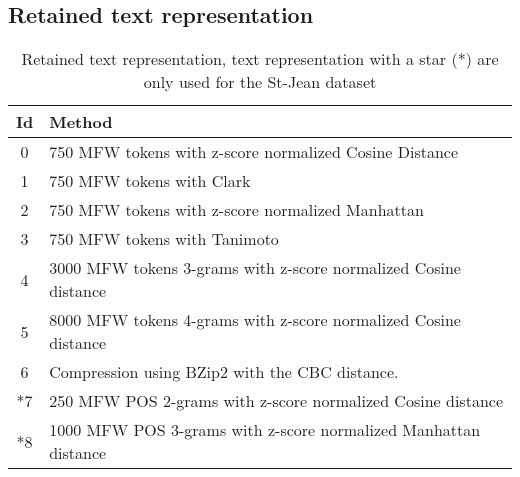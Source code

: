 \newpage
\subsection{Retained text representation}
\label{sec:annex_retained_text_representation}

\begin{table}[H]
  \centering
  \caption{Retained text representation, text representation with a star (*) are only used for the St-Jean dataset}
  \label{tab:9rl}
  \begin{tabular}{c l}
    \toprule
    Id &
    Method \\
    \midrule
    0 & 750 MFW tokens with z-score normalized Cosine Distance \\
    1 & 750 MFW tokens with Clark \\
    2 & 750 MFW tokens with z-score normalized Manhattan \\
    3 & 750 MFW tokens with Tanimoto \\
    4 & 3000 MFW tokens 3-grams with z-score normalized Cosine distance \\
    5 & 8000 MFW tokens 4-grams with z-score normalized Cosine distance \\
    6 & Compression using BZip2 with the CBC distance. \\
    *7 & 250 MFW POS 2-grams with z-score normalized Cosine distance \\
    *8 & 1000 MFW POS 3-grams with z-score normalized Manhattan distance \\
    \bottomrule
  \end{tabular}
\end{table}

